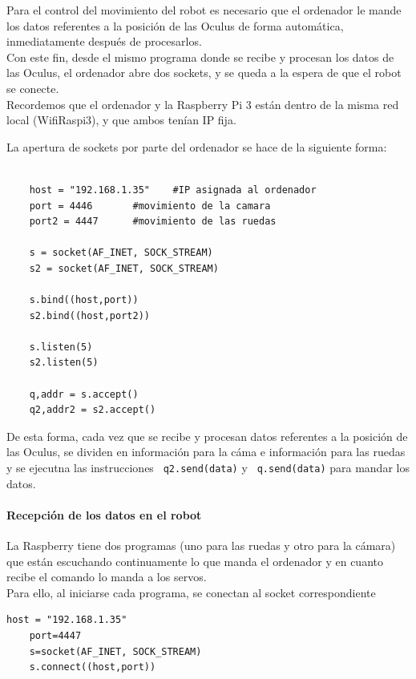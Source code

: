 \documentclass[twoside, 11pt]{epstfg}
\begin{document}
Para el control del movimiento del robot es necesario que el ordenador le mande los datos referentes a la posición de las Oculus de forma automática, inmediatamente después de procesarlos.\\
Con este fin, desde el mismo programa donde se recibe y procesan los datos de las Oculus, el ordenador abre dos sockets, y se queda a la espera de que el robot se conecte.\\
Recordemos que el ordenador y la Raspberry Pi 3 están dentro de la misma red local (WifiRaspi3), y que ambos tenían IP fija.

La apertura de sockets por parte del ordenador se hace de la siguiente forma:

\lstset{language=python, breaklines=true, basicstyle=\footnotesize}
\begin{lstlisting}[frame=single]

	host = "192.168.1.35"    #IP asignada al ordenador
	port = 4446       #movimiento de la camara
	port2 = 4447      #movimiento de las ruedas

	s = socket(AF_INET, SOCK_STREAM)
	s2 = socket(AF_INET, SOCK_STREAM)

	s.bind((host,port))
	s2.bind((host,port2))

	s.listen(5)
	s2.listen(5)

	q,addr = s.accept()
	q2,addr2 = s2.accept()

\end{lstlisting}

De esta forma, cada vez que se recibe y procesan datos referentes a la posición de las Oculus, se dividen en información para la cáma e información para las ruedas y se ejecutna las instrucciones \texttt{ q2.send(data)}  y \texttt{ q.send(data)} para mandar los datos.
\paragraph{Recepción de los datos en el robot}

La Raspberry tiene dos programas (uno para las ruedas y otro para la
cámara) que están escuchando continuamente lo que manda el ordenador y en
cuanto recibe el comando lo manda a los servos.\\
Para ello, al iniciarse cada programa, se conectan al socket correspondiente
\lstset{language=python, breaklines=true, basicstyle=\footnotesize}
\begin{lstlisting}[frame=single]
	host = "192.168.1.35"
	port=4447
	s=socket(AF_INET, SOCK_STREAM)
	s.connect((host,port))
\end{lstlisting}
\end{document}
